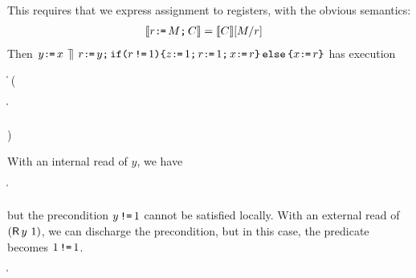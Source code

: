 This requires that we express assignment to registers, with the obvious
semantics:
\begin{align*}
  \llbracket r\texttt{:}\mkern-1mu\texttt{=}\,M\texttt{;}\, C\rrbracket & = \llbracket C\rrbracket[M/r]
\end{align*}
Then
\begin{math}
  y\texttt{:}\mkern-1mu\texttt{=}\, x
  \,\mathbin{\rrceil}\,
  r\texttt{:}\mkern-1mu\texttt{=}\, y\texttt{;}\,
  \texttt{if}\allowbreak\texttt{(}r \,\texttt{!=}\, 1\texttt{)} \allowbreak\texttt{\{} z\texttt{:}\mkern-1mu\texttt{=}\, 1\texttt{;}\, r\texttt{:}\mkern-1mu\texttt{=}\, 1\texttt{;}\, x\texttt{:}\mkern-1mu\texttt{=}\, r \texttt{\}}\,\allowbreak\texttt{else}\allowbreak\,\texttt{\{} x\texttt{:}\mkern-1mu\texttt{=}\, r \texttt{\}}
\end{math}
has execution
\begin{displaymathsmall}
  \begin{tikzcenter}[node distance=1em]
  \end{tikzcenter}
  \Biggm\|
  \prefix
  \left(
    \begin{tikzcenter}[node distance=1em]
    \end{tikzcenter}
    \biggm\|
    \begin{tikzcenter}[node distance=1em]
    \end{tikzcenter}
  \right)
\end{displaymathsmall}
With an internal read of $y$, we have
\begin{displaymathsmall}
  \begin{tikzcenter}[node distance=1em]
  \end{tikzcenter}
  \Biggm\|
    \begin{tikzcenter}[node distance=1em]
    \end{tikzcenter}
\end{displaymathsmall}
but the precondition $y\,\texttt{!=}\,1$ cannot be satisfied locally.
With an external read of $(\DR{y}{1})$, we can discharge the precondition, but in this
case, the predicate becomes $1\,\texttt{!=}\, 1$. 
\begin{displaymathsmall}
  \begin{tikzcenter}[node distance=1em]
  \end{tikzcenter}
  \Bigm\|  
    \begin{tikzcenter}[node distance=1em]
    \end{tikzcenter}
\end{displaymathsmall}


